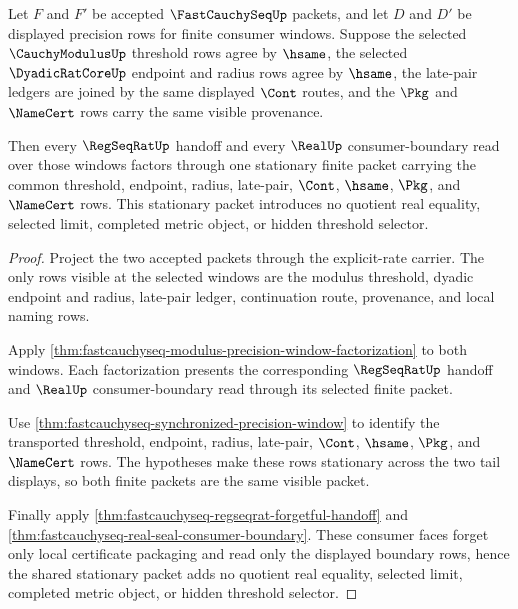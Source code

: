 \begin{theorem}
\label{thm:fastcauchyseq-tail-stationary-window-determinacy}
Let $F$ and $F'$ be accepted $\FastCauchySeqUp$ packets, and let $D$ and $D'$
be displayed precision rows for finite consumer windows. Suppose the selected
$\CauchyModulusUp$ threshold rows agree by $\hsame$, the selected
$\DyadicRatCoreUp$ endpoint and radius rows agree by $\hsame$, the late-pair
ledgers are joined by the same displayed $\Cont$ routes, and the $\Pkg$ and
$\NameCert$ rows carry the same visible provenance.

Then every $\RegSeqRatUp$ handoff and every $\RealUp$ consumer-boundary read
over those windows factors through one stationary finite packet carrying the
common threshold, endpoint, radius, late-pair, $\Cont$, $\hsame$, $\Pkg$, and
$\NameCert$ rows. This stationary packet introduces no quotient real equality,
selected limit, completed metric object, or hidden threshold selector.
\end{theorem}
\begin{proof}
Project the two accepted packets through the explicit-rate carrier. The only
rows visible at the selected windows are the modulus threshold, dyadic endpoint
and radius, late-pair ledger, continuation route, provenance, and local naming
rows.

Apply
\autoref{thm:fastcauchyseq-modulus-precision-window-factorization} to both
windows. Each factorization presents the corresponding $\RegSeqRatUp$ handoff
and $\RealUp$ consumer-boundary read through its selected finite packet.

Use \autoref{thm:fastcauchyseq-synchronized-precision-window} to identify the
transported threshold, endpoint, radius, late-pair, $\Cont$, $\hsame$, $\Pkg$,
and $\NameCert$ rows. The hypotheses make these rows stationary across the two
tail displays, so both finite packets are the same visible packet.

Finally apply
\autoref{thm:fastcauchyseq-regseqrat-forgetful-handoff} and
\autoref{thm:fastcauchyseq-real-seal-consumer-boundary}. These consumer faces
forget only local certificate packaging and read only the displayed boundary
rows, hence the shared stationary packet adds no quotient real equality,
selected limit, completed metric object, or hidden threshold selector.
\end{proof}


